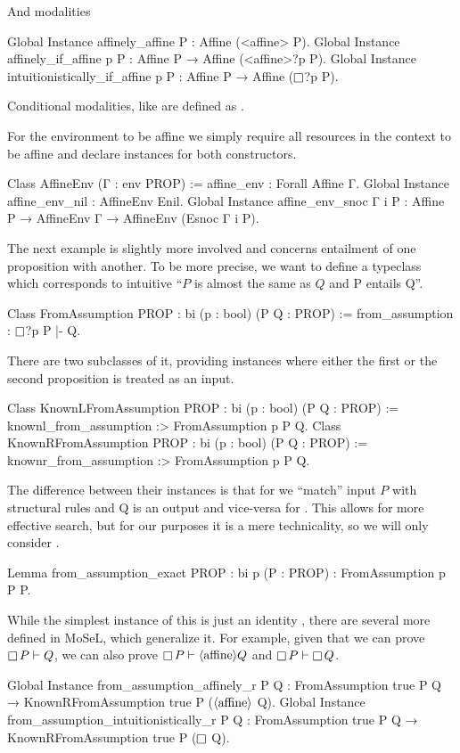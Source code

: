 And modalities
\begin{coq}
Global Instance affinely_affine P : Affine (<affine> P).
Global Instance affinely_if_affine p P : Affine P → Affine (<affine>?p P).
Global Instance intuitionistically_if_affine p P : Affine P → Affine ($\mathop{\Box}$?p P).
\end{coq}
Conditional modalities, like  are defined as .


For the environment to be affine we simply require all resources in the context to be affine and declare instances for both constructors.
\begin{coq}
Class AffineEnv (Γ : env PROP) := affine_env : Forall Affine Γ.
Global Instance affine_env_nil : AffineEnv Enil.
Global Instance affine_env_snoc Γ i P :
  Affine P → AffineEnv Γ → AffineEnv (Esnoc Γ i P).
\end{coq}

The next example is slightly more involved and concerns entailment of one proposition with another.
To be more precise, we want to define a typeclass which corresponds to intuitive ``\(P\) is almost the same as \(Q\) and P entails Q''.
\begin{coq}
Class FromAssumption {PROP : bi} (p : bool) (P Q : PROP) :=
  from_assumption : $\mathop{\Box}$?p P |- Q.
\end{coq}

There are two subclasses of it, providing instances where either the first or the second proposition is treated as an input.
\begin{coq}
Class KnownLFromAssumption {PROP : bi} (p : bool) (P Q : PROP) :=
  knownl_from_assumption :> FromAssumption p P Q.
Class KnownRFromAssumption {PROP : bi} (p : bool) (P Q : PROP) :=
  knownr_from_assumption :> FromAssumption p P Q.
\end{coq}

The difference between their instances is that for  we ``match'' input \(P\) with structural rules and Q is an output and vice-versa for .
This allows for more effective search, but for our purposes it is a mere technicality, so we will only consider .

\begin{coq}
Lemma from_assumption_exact {PROP : bi} p (P : PROP) : FromAssumption p P P.
\end{coq}

While the simplest instance of this is just an identity , there are several more defined in MoSeL, which generalize it.
For example, given that we can prove \(\mathop{\Box} P \vdash Q\), we can also prove \(\mathop{\Box} P \vdash \langle\text{affine}\rangle Q\) and  \(\mathop{\Box} P \vdash \mathop{\Box} Q\).
\begin{coq}
Global Instance from_assumption_affinely_r P Q :
  FromAssumption true P Q → KnownRFromAssumption true P ($\langle\text{affine}\rangle$ Q).
Global Instance from_assumption_intuitionistically_r P Q :
  FromAssumption true P Q → KnownRFromAssumption true P ($\mathop{\Box}$ Q).
\end{coq}

